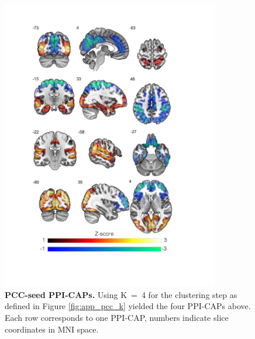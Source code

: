 \begin{figure}[h]
\centering
\includegraphics[width=0.85\textwidth]{images/Appendix/Appendix_Ch5_PPI-CAPs.pdf}
\caption{\textbf{PCC-seed PPI-CAPs.} Using K~=~4 for the clustering step as defined in Figure \ref{fig:app_pcc_k} yielded the four PPI-CAPs above. Each row corresponds to one PPI-CAP, numbers indicate slice coordinates in MNI space.}
\label{fig:app_pcc_ppicaps}
\end{figure}



